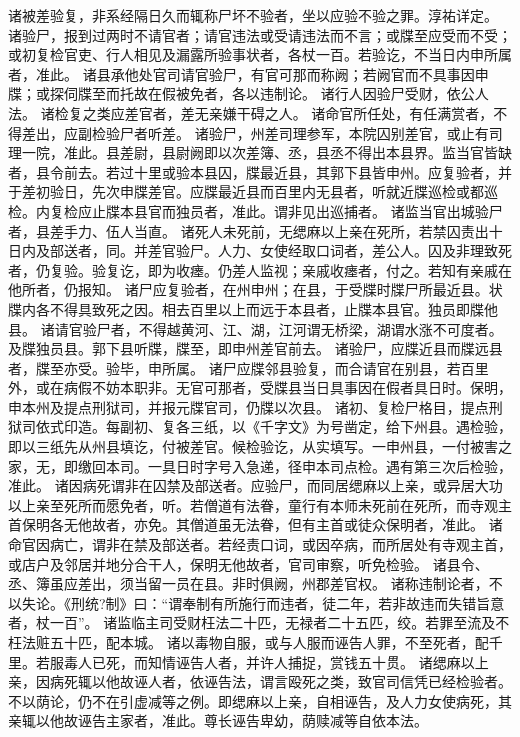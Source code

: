 \documentclass[12pt,UTF8]{ctexbook}
\begin{document}
诸被差验复，非系经隔日久而辄称尸坏不验者，坐以应验不验之罪。淳祐详定。
诸验尸，报到过两时不请官者；请官违法或受请违法而不言；或牒至应受而不受；或初复检官吏、行人相见及漏露所验事状者，各杖一百。若验讫，不当日内申所属者，准此。
诸县承他处官司请官验尸，有官可那而称阙；若阙官而不具事因申牒；或探伺牒至而托故在假被免者，各以违制论。
诸行人因验尸受财，依公人法。
诸检复之类应差官者，差无亲嫌干碍之人。
诸命官所任处，有任满赏者，不得差出，应副检验尸者听差。
诸验尸，州差司理参军，本院囚别差官，或止有司理一院，准此。县差尉，县尉阙即以次差簿、丞，县丞不得出本县界。监当官皆缺者，县令前去。若过十里或验本县囚，牒最近县，其郭下县皆申州。应复验者，并于差初验日，先次申牒差官。应牒最近县而百里内无县者，听就近牒巡检或都巡检。内复检应止牒本县官而独员者，准此。谓非见出巡捕者。
诸监当官出城验尸者，县差手力、伍人当直。
诸死人未死前，无缌麻以上亲在死所，若禁囚责出十日内及部送者，同。并差官验尸。人力、女使经取口词者，差公人。囚及非理致死者，仍复验。验复讫，即为收瘗。仍差人监视；亲戚收瘗者，付之。若知有亲戚在他所者，仍报知。
诸尸应复验者，在州申州；在县，于受牒时牒尸所最近县。状牒内各不得具致死之因。相去百里以上而远于本县者，止牒本县官。独员即牒他县。
诸请官验尸者，不得越黄河、江、湖，江河谓无桥梁，湖谓水涨不可度者。及牒独员县。郭下县听牒，牒至，即申州差官前去。
诸验尸，应牒近县而牒远县者，牒至亦受。验毕，申所属。
诸尸应牒邻县验复，而合请官在别县，若百里外，或在病假不妨本职非。无官可那者，受牒县当日具事因在假者具日时。保明，申本州及提点刑狱司，并报元牒官司，仍牒以次县。
诸初、复检尸格目，提点刑狱司依式印造。每副初、复各三纸，以《千字文》为号凿定，给下州县。遇检验，即以三纸先从州县填讫，付被差官。候检验讫，从实填写。一申州县，一付被害之家，无，即缴回本司。一具日时字号入急递，径申本司点检。遇有第三次后检验，准此。
诸因病死谓非在囚禁及部送者。应验尸，而同居缌麻以上亲，或异居大功以上亲至死所而愿免者，听。若僧道有法眷，童行有本师未死前在死所，而寺观主首保明各无他故者，亦免。其僧道虽无法眷，但有主首或徒众保明者，准此。
诸命官因病亡，谓非在禁及部送者。若经责口词，或因卒病，而所居处有寺观主首，或店户及邻居并地分合干人，保明无他故者，官司审察，听免检验。
诸县令、丞、簿虽应差出，须当留一员在县。非时俱阙，州郡差官权。
诸称违制论者，不以失论。《刑统?制》曰：“谓奉制有所施行而违者，徒二年，若非故违而失错旨意者，杖一百”。
诸监临主司受财枉法二十匹，无禄者二十五匹，绞。若罪至流及不枉法赃五十匹，配本城。
诸以毒物自服，或与人服而诬告人罪，不至死者，配千里。若服毒人已死，而知情诬告人者，并许人捕捉，赏钱五十贯。
诸缌麻以上亲，因病死辄以他故诬人者，依诬告法，谓言殴死之类，致官司信凭已经检验者。不以荫论，仍不在引虚减等之例。即缌麻以上亲，自相诬告，及人力女使病死，其亲辄以他故诬告主家者，准此。尊长诬告卑幼，荫赎减等自依本法。
\end{document}
